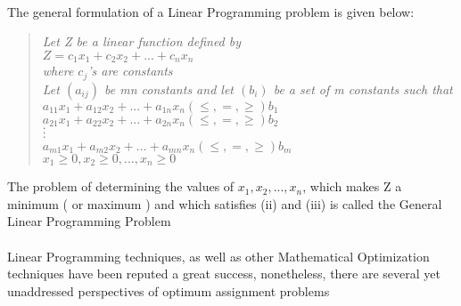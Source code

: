 \documentclass[a4paper]{book}
\begin{document}
			\paragraph{}
				The general formulation of a Linear Programming problem is given below:
				\begin{verse}
					\begin{center}
						\textit{
							Let Z be a linear function defined by \\
							$Z = c_1x_1 + c_2x_2+...+c_nx_n$ \\
							where $c_j$'s are constants \\
							Let $(a_{ij})$ be mn constants and let $(b_i)$ be a set of m constants such that \\
							$a_{11}x_1+a_{12}x_2+...+a_{1n}x_n (\leq,=,\geq) b_1$ \\
							$a_{21}x_1+a_{22}x_2+...+a_{2n}x_n (\leq,=,\geq) b_2$ \\
							$\cdot$ \\
							$\cdot$ \\
							$\cdot$ \\
							$a_{m1}x_1+a_{m2}x_2+...+a_{mn}x_n (\leq,=,\geq) b_m$ \\
							$x_1\geq0,x_2\geq0,...,x_n\geq0$ \\
						}                   
					\end{center}
				\end{verse}
				The problem of determining the values of $x_1, x_2,...,x_n$, which makes Z a minimum ( or maximum ) and which satisfies (ii) and (iii) is called the General Linear Programming Problem    
			\paragraph{}
				Linear Programming techniques, as well as other Mathematical Optimization techniques have been reputed a great success, nonetheless, there are several yet unaddressed perspectives of optimum assignment problems
\end{document}
